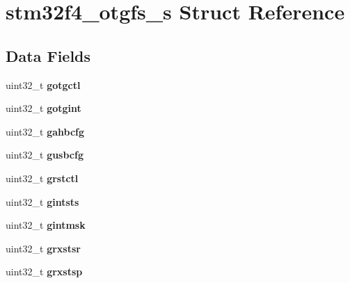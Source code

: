 \hypertarget{structstm32f4__otgfs__s}{}\section{stm32f4\+\_\+otgfs\+\_\+s Struct Reference}
\label{structstm32f4__otgfs__s}
\subsection*{Data Fields}
\begin{DoxyCompactItemize}
\item 
\mbox{\label{structstm32f4__otgfs__s_ade421d0455234b8334ce77768823e07a}} 
uint32\+\_\+t {\bfseries gotgctl}
\item 
\mbox{\label{structstm32f4__otgfs__s_ac4fb47841a3a79c52e8dcc384119732a}} 
uint32\+\_\+t {\bfseries gotgint}
\item 
\mbox{\label{structstm32f4__otgfs__s_a8b13ed5d0ea1ce52d23aae55324d56d4}} 
uint32\+\_\+t {\bfseries gahbcfg}
\item 
\mbox{\label{structstm32f4__otgfs__s_ac7b2b10b1dfb3724b1b9efb2552ae250}} 
uint32\+\_\+t {\bfseries gusbcfg}
\item 
\mbox{\label{structstm32f4__otgfs__s_a9368634739e1c95a34e67a229f0df102}} 
uint32\+\_\+t {\bfseries grstctl}
\item 
\mbox{\label{structstm32f4__otgfs__s_a99d280dab3daa948ce6e278b203adee6}} 
uint32\+\_\+t {\bfseries gintsts}
\item 
\mbox{\label{structstm32f4__otgfs__s_a4b64880a877354110654f33c1327f4b5}} 
uint32\+\_\+t {\bfseries gintmsk}
\item 
\mbox{\label{structstm32f4__otgfs__s_affc143cbb41df84172b5ec19040b5d34}} 
uint32\+\_\+t {\bfseries grxstsr}
\item 
\mbox{\label{structstm32f4__otgfs__s_ab2883bb6ad7eaf8253656cd61ea31080}} 
uint32\+\_\+t {\bfseries grxstsp}

\end{DoxyCompactItemize}
